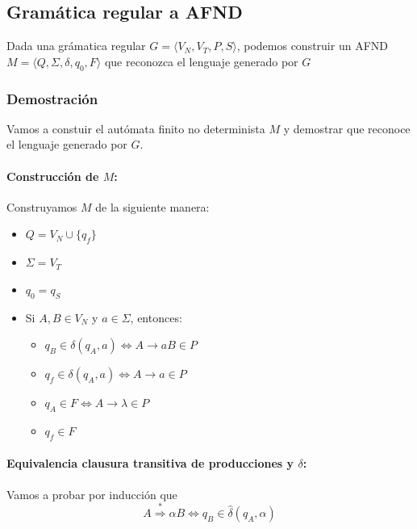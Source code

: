 \newpage
\subsection{Gramática regular a AFND}
Dada una grámatica regular \(G = \langle V_N, V_T, P, S\rangle\), podemos construir un AFND \(M=\langle Q,\Sigma, \delta, q_0, F\rangle\) que reconozca el lenguaje generado por \(G\)

\subsubsection{Demostración}
Vamos a constuir el autómata finito no determinista \(M\) y demostrar que reconoce el lenguaje generado por \(G\).
\paragraph{Construcción de \(M\):} Construyamos \(M\) de la siguiente manera:
\begin{itemize}
  \item \(Q = V_N\cup\{q_f\}\)
  \item \(\Sigma = V_T\)
  \item \(q_0 = q_S\)
  \item Si \(A, B \in V_N\) y \(a\in\Sigma\), entonces:
        \begin{itemize}
          \item \(q_B\in\delta(q_A, a) \iff A \rightarrow aB \in P\)
          \item \(q_f \in \delta(q_A, a) \iff A \rightarrow a \in P\)
          \item \(q_A\in F \iff A \rightarrow \lambda \in P\)
          \item \(q_f\in F\)
        \end{itemize}
\end{itemize}

\paragraph{Equivalencia clausura transitiva de producciones y \(\delta\): } Vamos a probar por inducción que
\[A   \overset{*}{\Rightarrow} \alpha B \iff q_B\in\hat\delta(q_A, \alpha)\]

